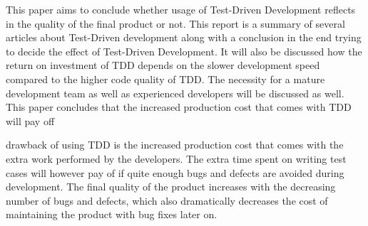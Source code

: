 This paper aims to conclude whether usage of Test-Driven Development reflects in the quality of the final product or not. This report is a summary of several articles about Test-Driven development along with a conclusion in the end trying to decide the effect of Test-Driven Development. It will also be discussed how the return on investment of TDD depends on the slower development speed compared to the higher code quality of TDD.  The necessity for a mature development team as well as experienced developers will be discussed as well. 
This paper concludes that the increased production cost that comes with TDD will pay off 

drawback of using TDD is the increased production cost that comes with the extra work
performed by the developers. The extra time spent on writing test cases will however pay of
if quite enough bugs and defects are avoided during development. The final quality of the
product increases with the decreasing number of bugs and defects, which also dramatically
decreases the cost of maintaining the product with bug fixes later on.

